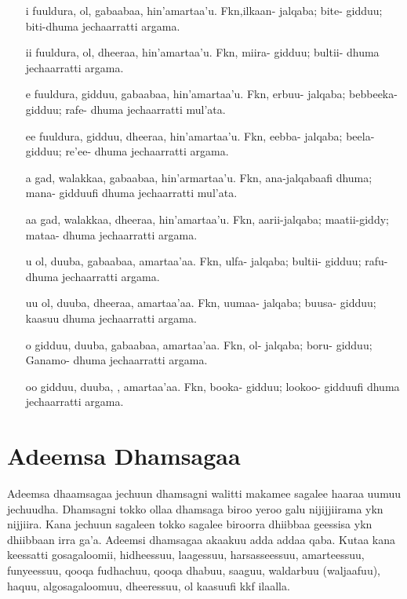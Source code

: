 \documentclass[11pt,b5paper]{book}
\begin{document}
\begin{itemize}
\begin{itemize}
        \item[i] fuuldura, ol, gabaabaa, hin’amartaa’u. Fkn,ilkaan- jalqaba; bite- gidduu; biti-dhuma jechaarratti argama.
        \item[ii] fuuldura, ol, dheeraa, hin’amartaa’u. Fkn, miira- gidduu; bultii- dhuma jechaarratti argama.
        \item[e] fuuldura, gidduu, gabaabaa, hin’amartaa’u. Fkn, erbuu- jalqaba; bebbeeka- gidduu; rafe- dhuma jechaarratti mul'ata.
        \item[ee] fuuldura, gidduu, dheeraa, hin’amartaa’u. Fkn, eebba- jalqaba; beela- gidduu; re’ee- dhuma jechaarratti argama.
        \item[a] gad, walakkaa, gabaabaa, hin’armartaa’u. Fkn, ana-jalqabaafi dhuma; mana- gidduufi dhuma jechaarratti mul'ata.
        \item[aa] gad, walakkaa, dheeraa, hin’amartaa’u. Fkn, aarii-jalqaba; maatii-giddy; mataa- dhuma jechaarratti argama.
        \item[u] ol, duuba, gabaabaa, amartaa’aa. Fkn, ulfa- jalqaba; bultii- gidduu; rafu-dhuma jechaarratti argama.
        \item[uu] ol, duuba, dheeraa, amartaa’aa. Fkn, uumaa- jalqaba; buusa- gidduu; kaasuu dhuma jechaarratti argama.
        \item[o] gidduu, duuba, gabaabaa, amartaa’aa. Fkn, ol- jalqaba; boru- gidduu; Ganamo- dhuma jechaarratti argama.
        \item[oo] gidduu, duuba, , amartaa’aa. Fkn, booka- gidduu; lookoo- gidduufi dhuma jechaarratti argama.

\end{itemize}

\section{Adeemsa Dhamsagaa}

Adeemsa dhaamsagaa jechuun dhamsagni walitti makamee  sagalee haaraa uumuu jechuudha. Dhamsagni tokko ollaa  dhamsaga biroo yeroo galu nijijjiirama ykn nijjiira. Kana  jechuun sagaleen tokko sagalee biroorra dhiibbaa geessisa ykn  dhiibbaan irra ga'a. Adeemsi dhamsagaa akaakuu adda addaa  qaba. Kutaa kana keessatti gosagaloomii, hidheessuu, laagessuu, harsasseessuu, amarteessuu, funyeessuu, qooqa  fudhachuu, qooqa dhabuu, saaguu, waldarbuu (waljaafuu),  haquu, algosagaloomuu, dheeressuu, ol kaasuufi kkf ilaalla. 


\end{itemize}
\end{document}
